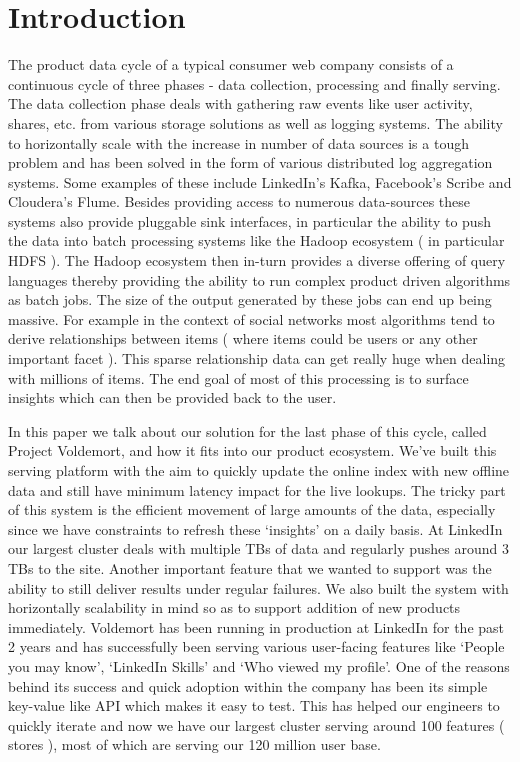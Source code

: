 \documentclass[10pt,twocolumn,preprint,natbib,authoryear]{sigplanconf}
\begin{document}
\section{Introduction}
The product data cycle of a typical consumer web company consists of a continuous cycle of three phases - data collection, processing and finally serving. The data collection phase deals with gathering raw events like user activity, shares, etc. from various storage solutions as well as logging systems. The ability to horizontally scale with the increase in number of data sources is a tough problem and has been solved in the form of various distributed log aggregation systems. Some examples of these include LinkedIn's Kafka\cite{1}, Facebook's Scribe\cite{2} and Cloudera's Flume\cite{3}. Besides providing access to numerous data-sources these systems also provide pluggable sink interfaces, in particular the ability to push the data into batch processing systems like the Hadoop ecosystem ( in particular HDFS )\cite{4}. The Hadoop ecosystem then in-turn provides a diverse offering of query languages thereby providing the ability to run complex product driven algorithms as batch jobs. The size of the output generated by these jobs can end up being massive. For example in the context of social networks most algorithms tend to derive relationships between items ( where items could be users or any other important facet ). This sparse relationship data can get really huge when dealing with millions of items. The end goal of most of this processing is to surface insights which can then be provided back to the user.

In this paper we talk about our solution for the last phase of this cycle, called Project Voldemort, and how it fits into our product ecosystem. We've built this serving platform with the aim to quickly update the online index with new offline data and still have minimum latency impact for the live lookups. The tricky part of this system is the efficient movement of large amounts of the data, especially since we have constraints to refresh these `insights' on a daily basis. At LinkedIn our largest cluster deals with multiple TBs of data and regularly pushes around 3 TBs to the site. Another important feature that we wanted to support was the ability to still deliver results under regular failures. We also built the system with horizontally scalability in mind so as to support addition of new products immediately. Voldemort has been running in production at LinkedIn for the past 2 years and has successfully been serving various user-facing features like `People you may know', `LinkedIn Skills' and `Who viewed my profile'. One of the reasons behind its success and quick adoption within the company has been its simple key-value like API which makes it easy to test. This has helped our engineers to quickly iterate and now we have our largest cluster serving around 100 features ( stores ), most of which are serving our 120 million user base.
\end{document}
